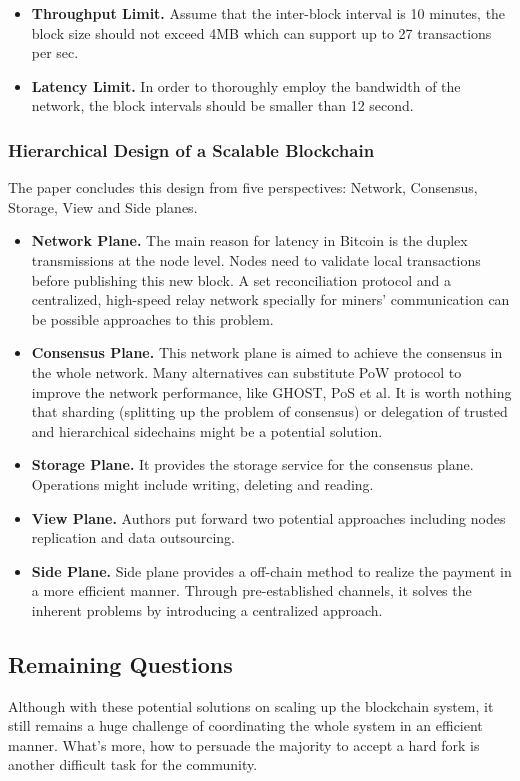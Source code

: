 \documentclass[conference]{IEEEtran}
\begin{document}
\begin{itemize}
    \item \textbf{Throughput Limit.} Assume that the inter-block interval is 10 minutes, the block size should not exceed 4MB which can support up to 27 transactions per sec.
    \item \textbf{Latency Limit.} In order to thoroughly employ the bandwidth of the network, the block intervals should be smaller than 12 second.
\end{itemize}

\subsubsection{Hierarchical Design of a Scalable Blockchain}
The paper concludes this design from five perspectives: Network, Consensus, Storage, View and Side planes.

\begin{itemize}
    \item \textbf{Network Plane.} The main reason for latency in Bitcoin is the duplex transmissions at the node level. 
    Nodes need to validate local transactions before publishing this new block.
    A set reconciliation protocol and a centralized, high-speed relay network specially for miners' communication can be possible approaches to this problem.
    \item \textbf{Consensus Plane.} This network plane is aimed to achieve the consensus in the whole network. 
    Many alternatives can substitute PoW protocol to improve the network performance, like GHOST, PoS et al.
    It is worth nothing that sharding (splitting up the problem of consensus) or delegation of trusted and hierarchical sidechains might be a potential solution.
    \item \textbf{Storage Plane.} It provides the storage service for the consensus plane. Operations might include writing, deleting and reading.
    \item \textbf{View Plane.} Authors put forward two potential approaches including nodes replication and data outsourcing.
    \item \textbf{Side Plane.} Side plane provides a off-chain method to realize the payment in a more efficient manner. 
    Through pre-established channels, it solves the inherent problems by introducing a centralized approach.
\end{itemize}

\subsection{Remaining Questions}
Although with these potential solutions on scaling up the blockchain system, it still remains a huge challenge of coordinating the whole system in an efficient manner.
%
What's more, how to persuade the majority to accept a hard fork is another difficult task for the community. 



\end{document}
